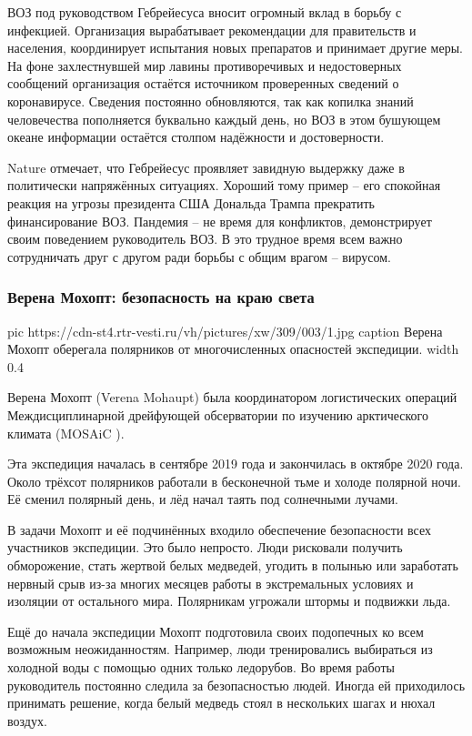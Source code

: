 ВОЗ под руководством Гебрейесуса вносит огромный вклад в борьбу с инфекцией.
Организация вырабатывает рекомендации для правительств и населения,
координирует испытания новых препаратов и принимает другие меры. На фоне
захлестнувшей мир лавины противоречивых и недостоверных сообщений организация
остаётся источником проверенных сведений о коронавирусе. Сведения постоянно
обновляются, так как копилка знаний человечества пополняется буквально каждый
день, но ВОЗ в этом бушующем океане информации остаётся столпом надёжности и
достоверности.

Nature отмечает, что Гебрейесус проявляет завидную выдержку даже в политически
напряжённых ситуациях. Хороший тому пример – его спокойная реакция на угрозы
президента США Дональда Трампа прекратить финансирование ВОЗ. Пандемия – не
время для конфликтов, демонстрирует своим поведением руководитель ВОЗ. В это
трудное время всем важно сотрудничать друг с другом ради борьбы с общим врагом
– вирусом.

\subsubsection{Верена Мохопт: безопасность на краю света}


\ifcmt
  pic https://cdn-st4.rtr-vesti.ru/vh/pictures/xw/309/003/1.jpg
	caption Верена Мохопт оберегала полярников от многочисленных опасностей экспедиции.
  width 0.4
\fi

Верена Мохопт (Verena Mohaupt) была координатором логистических операций
Междисциплинарной дрейфующей обсерватории по изучению арктического климата
(MOSAiC ).

Эта экспедиция началась в сентябре 2019 года и закончилась в октябре 2020 года.
Около трёхсот полярников работали в бесконечной тьме и холоде полярной ночи. Её
сменил полярный день, и лёд начал таять под солнечными лучами.

В задачи Мохопт и её подчинённых входило обеспечение безопасности всех
участников экспедиции. Это было непросто. Люди рисковали получить обморожение,
стать жертвой белых медведей, угодить в полынью или заработать нервный срыв
из-за многих месяцев работы в экстремальных условиях и изоляции от остального
мира. Полярникам угрожали штормы и подвижки льда.

Ещё до начала экспедиции Мохопт подготовила своих подопечных ко всем возможным
неожиданностям. Например, люди тренировались выбираться из холодной воды с
помощью одних только ледорубов. Во время работы руководитель постоянно следила
за безопасностью людей. Иногда ей приходилось принимать решение, когда белый
медведь стоял в нескольких шагах и нюхал воздух.

